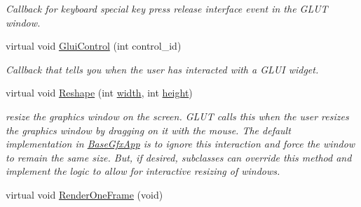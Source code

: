 \begin{DoxyCompactItemize}
\begin{DoxyCompactList}\small\item\em Callback for keyboard special key press release interface event in the G\+L\+UT window. \end{DoxyCompactList}\item 
virtual void \hyperlink{classimage__tools_1_1BaseGfxApp_a62fbfbb3b1f3e9d476e82c8e7640e78e}{Glui\+Control} (int control\+\_\+id)\hypertarget{classimage__tools_1_1BaseGfxApp_a62fbfbb3b1f3e9d476e82c8e7640e78e}{}\label{classimage__tools_1_1BaseGfxApp_a62fbfbb3b1f3e9d476e82c8e7640e78e}

\begin{DoxyCompactList}\small\item\em Callback that tells you when the user has interacted with a G\+L\+UI widget. \end{DoxyCompactList}\item 
virtual void \hyperlink{classimage__tools_1_1BaseGfxApp_a082984712d240d055abe10d9d9ba5297}{Reshape} (int \hyperlink{classimage__tools_1_1BaseGfxApp_a2fe403c5392f624477c2ce4429f1a7b5}{width}, int \hyperlink{classimage__tools_1_1BaseGfxApp_aa961e13a7a8e6062204223cc33ac7503}{height})\hypertarget{classimage__tools_1_1BaseGfxApp_a082984712d240d055abe10d9d9ba5297}{}\label{classimage__tools_1_1BaseGfxApp_a082984712d240d055abe10d9d9ba5297}

\begin{DoxyCompactList}\small\item\em resize the graphics window on the screen. G\+L\+UT calls this when the user resizes the graphics window by dragging on it with the mouse. The default implementation in \hyperlink{classimage__tools_1_1BaseGfxApp}{Base\+Gfx\+App} is to ignore this interaction and force the window to remain the same size. But, if desired, subclasses can override this method and implement the logic to allow for interactive resizing of windows. \end{DoxyCompactList}\item 
virtual void \hyperlink{classimage__tools_1_1BaseGfxApp_ae4dd5d263aa016d5e767a90c4e102e49}{Render\+One\+Frame} (void)\hypertarget{classimage__tools_1_1BaseGfxApp_ae4dd5d263aa016d5e767a90c4e102e49}{}\label{classimage__tools_1_1BaseGfxApp_ae4dd5d263aa016d5e767a90c4e102e49}


\end{DoxyCompactItemize}
